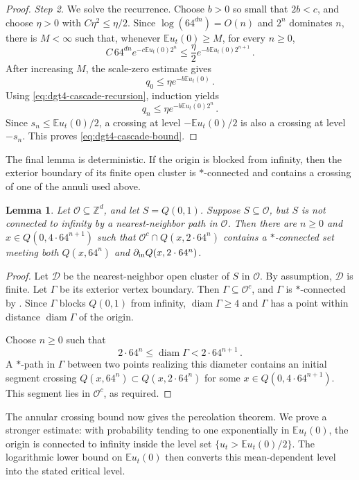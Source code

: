 \documentclass[11pt]{amsart}
\theoremstyle{plain}
\newtheorem{lemma}[theorem]{Lemma}
\theoremstyle{definition}
\newcommand{\Z}{\mathbb{Z}}
\newcommand{\E}{\mathbb{E}}
\begin{document}
\begin{proof}
			\emph{Step 2.} We solve the recurrence. Choose $b>0$ so small that
			$2b<c$, and choose $\eta>0$ with $C\eta^2\leq\eta/2$. Since
			$\log(64^{dn})=O(n)$ and $2^n$ dominates $n$, there is $M<\infty$
			such that, whenever $\E u_t(0)\geq M$, for every $n\geq 0$,
			\[
				C\,64^{dn} e^{-c\E u_t(0)2^n}
				\leq
				\frac{\eta}{2}e^{-b\E u_t(0)2^{n+1}}\, .
			\]
			After increasing $M$, the scale-zero estimate gives
			\[
				q_0\leq\eta e^{-b\E u_t(0)}\, .
			\]
			Using \eqref{eq:dgt4-cascade-recursion}, induction yields
			\[
				q_n\leq\eta e^{-b\E u_t(0)2^n}\, .
			\]
			Since $s_n\leq\E u_t(0)/2$, a crossing at level $-\E u_t(0)/2$ is
			also a crossing at level $-s_n$. This proves
			\eqref{eq:dgt4-cascade-bound}.
		\end{proof}

	The final lemma is deterministic. If the origin is blocked from infinity,
	then the exterior boundary of its finite open cluster is $\ast$-connected
	and contains a crossing of one of the annuli used above.
	\begin{lemma}\label{lem:dgt4-blocking-to-crossing}
		Let $\mathcal O\subseteq\Z^d$, and let $S=Q(0,1)$. Suppose
		$S\subseteq\mathcal O$, but $S$ is not connected to infinity by a
		nearest-neighbor path in $\mathcal O$.
		Then there are $n\geq0$ and $x\in Q(0,4\cdot64^{n+1})$ such that
		$\mathcal O^c\cap Q(x,2\cdot64^n)$ contains a $\ast$-connected set
		meeting both $Q(x,64^n)$ and $\partial_{\rm in}Q(x,2\cdot64^n)$.
	\end{lemma}
	\begin{proof}
		Let $\mathcal D$ be the nearest-neighbor open cluster of $S$ in
		$\mathcal O$. By assumption, $\mathcal D$ is finite. Let $\Gamma$ be
		its exterior vertex boundary. Then $\Gamma\subseteq\mathcal O^c$, and
		$\Gamma$ is $\ast$-connected by \citet[Theorem~3]{Timar}. Since
		$\Gamma$ blocks $Q(0,1)$ from infinity, $\operatorname{diam}\Gamma\geq4$
		and $\Gamma$ has a point within distance $\operatorname{diam}\Gamma$ of
		the origin.

		Choose $n\geq0$ such that
		\[
			2\cdot64^n
			\leq
			\operatorname{diam}\Gamma
			<2\cdot64^{n+1}\, .
		\]
		A $\ast$-path in $\Gamma$ between two points realizing this diameter
		contains an initial segment crossing
		$Q(x,64^n)\subset Q(x,2\cdot64^n)$ for some
		$x\in Q(0,4\cdot64^{n+1})$. This segment lies in $\mathcal O^c$, as
		required.
	\end{proof}

	The annular crossing bound now gives the percolation theorem. We prove a
	stronger estimate: with probability tending to one exponentially in
	$\E u_t(0)$, the origin is connected to infinity inside the level set
	$\{u_t>\E u_t(0)/2\}$. The logarithmic lower bound on $\E u_t(0)$ then
	converts this mean-dependent level into the stated critical level.
\end{document}
